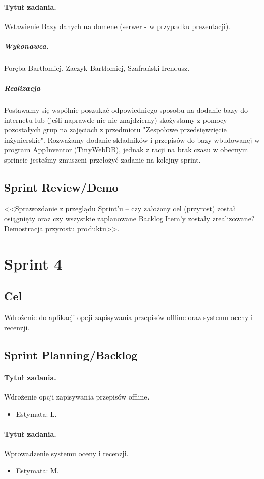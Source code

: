 \documentclass[a4paper]{article}
\begin{document}
	
	\paragraph{Tytuł zadania.} Wstawienie Bazy danych na domene (serwer - w przypadku prezentacji).
	\subparagraph{Wykonawca.} Poręba Bartłomiej, Zaczyk Bartłomiej, Szafrański Ireneusz.
	\subparagraph{Realizacja}
	Postawamy się wspólnie poszukać odpowiedniego sposobu na dodanie bazy do internetu lub (jeśli naprawde nic nie znajdziemy) skożystamy z pomocy pozostałych grup na zajęciach z przedmiotu "Zespołowe przedsięwzięcie inżynierskie". Rozważamy dodanie składników i przepisów do bazy wbudowanej w program AppInventor (TinyWebDB), jednak z racji na brak czasu w obecnym sprincie jesteśmy zmuszeni przełożyć zadanie na kolejny sprint.
	
	
	\subsection{Sprint Review/Demo}
	<<Sprawozdanie z przeglądu Sprint'u -- czy założony cel (przyrost) został osiągnięty oraz czy wszystkie zaplanowane Backlog Item'y zostały zrealizowane? Demostracja przyrostu produktu>>.
	
	
	\section{Sprint 4}
	
	\subsection{Cel} Wdrożenie do aplikacji opcji zapisywania przepisów offline oraz systemu oceny i recenzji.
	
	\subsection{Sprint Planning/Backlog}
	
	\paragraph{Tytuł zadania.} Wdrożenie opcji zapisywania przepisów offline.
	\begin{itemize}
		\item Estymata: L.
	\end{itemize}
	
	\paragraph{Tytuł zadania.} Wprowadzenie systemu oceny i recenzji.
	\begin{itemize}
		\item Estymata: M.
	\end{itemize}
	
\end{document}
